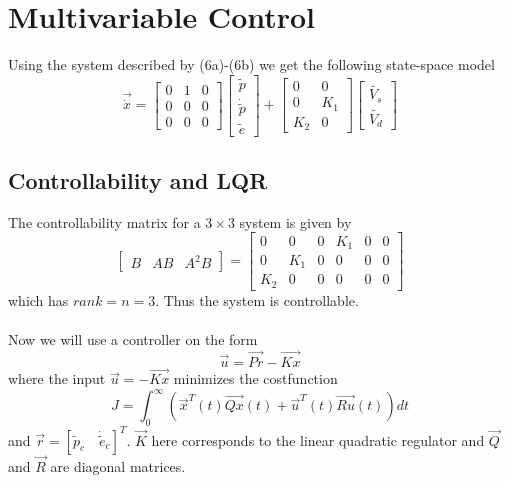 \section{Multivariable Control}

Using the system described by (6a)-(6b) we get the following state-space model
\begin{equation}
    \vec{\dot{x}} = \begin{bmatrix}     %
                                0&1&0\\
                                0&0&0\\
                                0&0&0
                    \end{bmatrix}
                    \begin{bmatrix}     %
                                \tilde{p}\\
                                \dot{\tilde{p}}\\
                                \tilde{e}
                    \end{bmatrix}
                    +
                    \begin{bmatrix}     %
                                0&0\\
                                0&K_1\\
                                K_2&0
                    \end{bmatrix}
                    \begin{bmatrix}     %
                                \tilde{V_s}\\
                                \tilde{V_d}
                    \end{bmatrix}
\end{equation}
%
\subsection{Controllability and LQR}
The controllability matrix for a $3\times3$ system is given by
\begin{equation}
    \begin{bmatrix}
            B & AB & A^2B
    \end{bmatrix}
    =
    \begin{bmatrix}
            0&0&0&K_1&0&0\\
            0&K_1&0&0&0&0\\
            K_2&0&0&0&0&0
    \end{bmatrix}
\end{equation}
which has $ rank = n = 3 $. Thus the system is controllable.\\ \\
Now we will use a controller on the form $$ \vec{u} = \vec{Pr}-\vec{Kx}$$
where the input $\vec{u} = -\vec{Kx}$ minimizes the costfunction 
$$J = \int_{0}^{\infty}(\vec{x}^T(t)\vec{Qx}(t) + \vec{u}^T(t)\vec{Ru}(t))dt $$ and $\vec{r} = [\tilde{p}_c \quad \dot{\tilde{e}}_c]^T$. $\vec{K}$ here corresponds to the linear quadratic regulator and $\vec{Q}$ and $\vec{R}$ are diagonal matrices. \\

